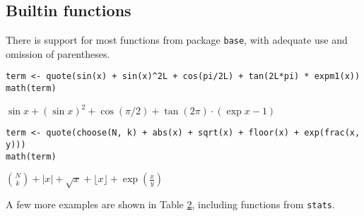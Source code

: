 \hypertarget{builtin-functions}{%
\subsection{Builtin functions}\label{builtin-functions}}

There is support for most functions from package \texttt{base}, with adequate
use and omission of parentheses.

\begin{verbatim}
term <- quote(sin(x) + sin(x)^2L + cos(pi/2L) + tan(2L*pi) * expm1(x))
math(term)
\end{verbatim}

\({{{\sin{x}}{+}{{\left(\sin{x}\right)}^{2}}}{+}{\cos{\left({\pi}{/}{2}\right)}}}{+}{{\tan{\left({2}{{}}{\pi}\right)}}{\cdot}{\left({\exp{x}}{-}{1}\right)}}\)

\begin{verbatim}
term <- quote(choose(N, k) + abs(x) + sqrt(x) + floor(x) + exp(frac(x, y)))
math(term)
\end{verbatim}

\({{{{\binom{N}{k}}{+}{{\left\vert{x}\right\vert}}}{+}{\sqrt{x}}}{+}{\lfloor{x}\rfloor}}{+}{\exp{\left(\frac{x}{y}\right)}}\)

A few more examples are shown in Table
\protect\hyperlink{tab:base-stats}{2},
including functions from \texttt{stats}.

